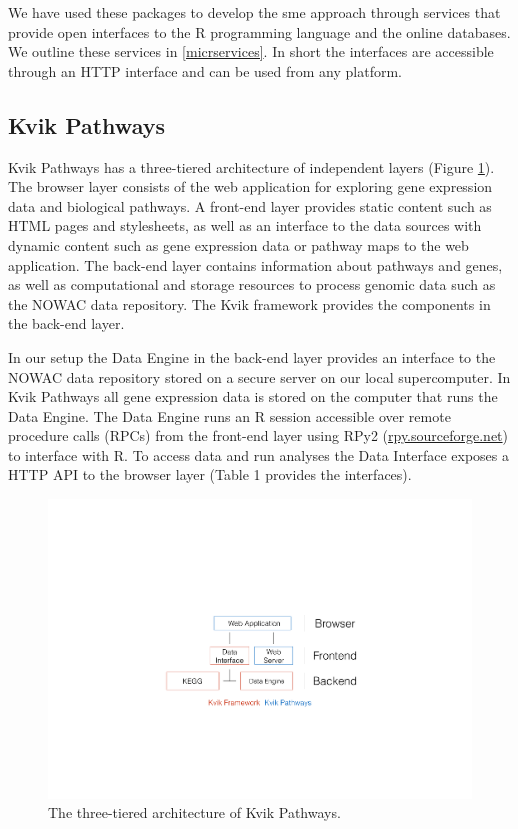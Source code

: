 We have used these packages to develop the \gls{sme} approach through services
that provide open interfaces to the R programming language and the online
databases.  We outline these services in \ref{micrservices}.  In short the
interfaces are accessible through an HTTP interface and can be used from any
platform.

\subsection{Kvik Pathways} 
Kvik Pathways has a three-tiered architecture of independent layers (Figure
\ref{fig:arch}). The browser layer consists of the web application for
exploring gene expression data and biological pathways. A front-end layer
provides static content such as HTML pages and stylesheets, as well as an
interface to the data sources with dynamic content such as gene expression
data or pathway maps to the web application. The back-end layer contains
information about pathways and genes, as well as computational and storage
resources to process genomic data such as the NOWAC data repository. The
Kvik framework provides the components in the back-end layer. 

In our setup the Data Engine in the back-end layer provides an interface to
the NOWAC data repository stored on a secure server on our local
supercomputer. In Kvik Pathways all gene
expression data is stored on the computer that runs the Data Engine. The
Data Engine runs an R session accessible over remote procedure calls (RPCs)
from the front-end layer using RPy2
(\href{rpy.sourceforge.net}{rpy.sourceforge.net}) to interface with R. To
access data and run analyses the Data Interface exposes a HTTP API to the
browser layer (Table 1 provides the interfaces).

\begin{figure}[htb]
    \begin{centering}
    \includegraphics[width=\textwidth]{figures/archv2.pdf}
    \caption{The three-tiered architecture of Kvik Pathways.} 
    \label{fig:arch}
    \end{centering} 
\end{figure}   


